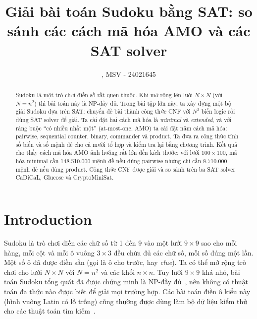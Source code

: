 \documentclass[a4paper,fleqn]{cas-sc}
\newcommand{\AuthorName}{}
\newcommand{\AuthorEmail}{}
\newcommand{\AutoAbstract}{}\newcommand{\AutoAmo}{}\newcommand{\AutoSolvers}{}
\begin{document}
\let\WriteBookmarks\relax
\def\floatpagepagefraction{1}
\def\textpagefraction{.001}

\shortauthors{\AuthorName}

\title [mode = title]{Giải bài toán Sudoku bằng SAT: so sánh các cách mã hóa AMO và các SAT solver}

\author[1]{\AuthorName , MSV - 24021645}
\cormark[1]
\ead{\AuthorEmail}


\begin{abstract}
Sudoku là một trò chơi điền số rất quen thuộc. Khi mở rộng lên lưới $N\times N$ (với $N=n^2$) thì bài toán này là NP-đầy đủ. Trong bài tập lớn này, ta xây dựng một bộ giải Sudoku dựa trên SAT: chuyển đề bài thành công thức CNF với $N^3$ biến logic rồi dùng SAT solver để giải. Ta cài đặt hai cách mã hóa là \emph{minimal} và \emph{extended}, và với ràng buộc ``có nhiều nhất một'' (at-most-one, AMO) ta cài đặt năm cách mã hóa: pairwise, sequential counter, binary, commander và product. Ta đưa ra công thức tính số biến và số mệnh đề cho cả mười tổ hợp và kiểm tra lại bằng chương trình. Kết quả cho thấy cách mã hóa AMO ảnh hưởng rất lớn đến kích thước: với lưới $100\times100$, mã hóa minimal cần 148.510.000 mệnh đề nếu dùng pairwise nhưng chỉ cần 8.710.000 mệnh đề nếu dùng product. Công thức CNF được giải và so sánh trên ba SAT solver CaDiCaL, Glucose và CryptoMiniSat. \AutoAbstract
\end{abstract}



\maketitle

\section{Introduction}\label{sec:intro}

Sudoku là trò chơi điền các chữ số từ 1 đến 9 vào một lưới $9\times9$ sao cho mỗi hàng, mỗi cột và mỗi ô vuông $3\times3$ đều chứa đủ các chữ số, mỗi số đúng một lần. Một số ô đã được điền sẵn (gọi là ô cho trước, hay \emph{clue}). Ta có thể mở rộng trò chơi cho lưới $N\times N$ với $N=n^2$ và các khối $n\times n$. Tuy lưới $9\times9$ khá nhỏ, bài toán Sudoku tổng quát đã được chứng minh là NP-đầy đủ~\citep{yato2003}, nên không có thuật toán đa thức nào được biết để giải mọi trường hợp. Các bài toán điền ô kiểu này (hình vuông Latin có lỗ trống) cũng thường được dùng làm bộ dữ liệu kiểm thử cho các thuật toán tìm kiếm~\citep{gomes1997}.
\end{document}
